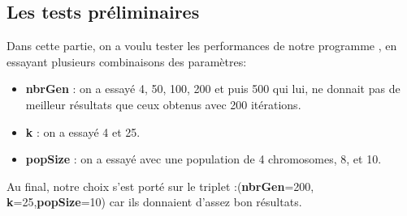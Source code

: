 \documentclass{article}
\begin{document}
\subsection{Les tests préliminaires}
Dans cette partie, on a voulu tester les performances de notre programme , en essayant plusieurs combinaisons des paramètres:
\begin{itemize}
	\item \textbf{nbrGen} : on a essayé 4, 50, 100, 200 et puis 500 qui lui,  ne donnait pas de meilleur  résultats que ceux obtenus avec 200 itérations.
	\item\textbf{ k} : on a essayé 4 et 25.
	\item \textbf{popSize} : on a essayé avec une population de 4 chromosomes, 8, et 10.
\end{itemize}
Au final, notre choix s’est porté sur le triplet :(\textbf{nbrGen}=200,\textbf{ k}=25,\textbf{popSize}=10) car ils donnaient d’assez bon résultats.
\end{document}
